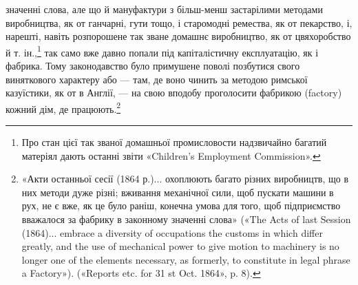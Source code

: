 значенні слова, але що й мануфактури з більш-менш застарілими
методами виробництва, як от ганчарні, гути тощо, і старомодні
ремества, як от пекарство, і, нарешті, навіть розпорошене
так зване домашнє виробництво, як от цвяхоробство й т. ін.,\footnote{
Про стан цієї так званої домашньої промисловости надзвичайно
багатий матеріял дають останні звіти «Children’s Employment Commission».
}
так само вже давно попали під капіталістичну експлуатацію,
як і фабрика. Тому законодавство було примушене поволі
позбутися свого виняткового характеру або — там, де воно чинить
за методою римської казуїстики, як от в Англії, — на свою вподобу
проголосити фабрикою (factory) кожний дім, де працюють.\footnote{
«Акти останньої сесії (1864 р.)... охоплюють багато різних виробництв,
що в них методи дуже різні; вживання механічної сили, щоб пускати
машини в рух, не є вже, як це було раніш, конечна умова для того, щоб
підприємство вважалося за фабрику в законному значенні слова» («The
Acts of last Session (1864)... embrace a diversity of occupations the customs
in which differ greatly, and the use of mechanical power to give motion to
machinery is no longer one of the elements necessary, as formerly, to constitute
in legal phrase a Factory»). («Reports etc. for 31 st Oct. 1864», p. 8).
}

